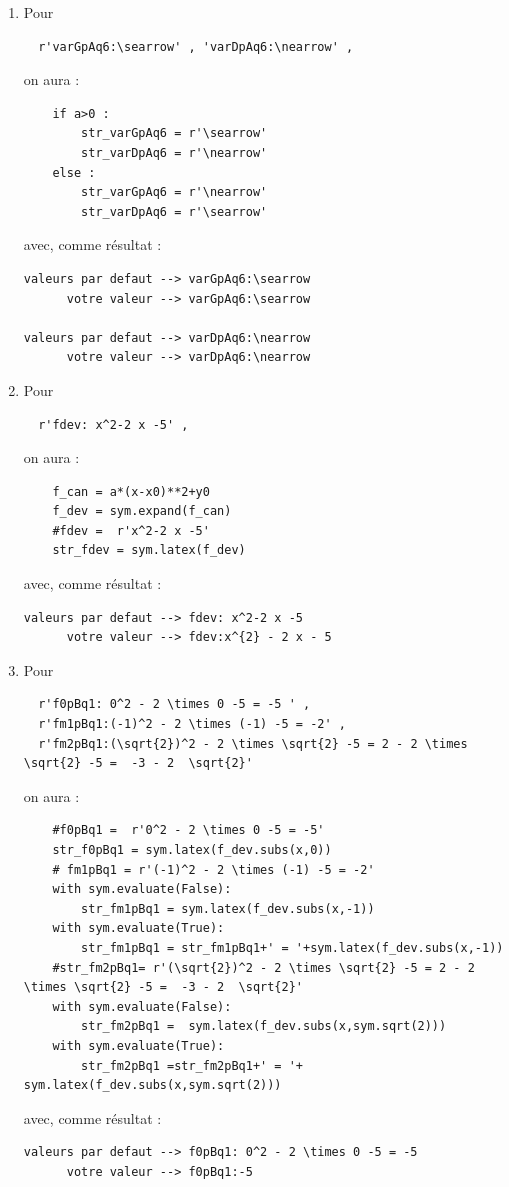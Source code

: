 {\begin{enumerate}
\begin{verbatim}
\end{verbatim}
avec, comme résultat : 
\begin{verbatim}
valeurs par defaut --> ques5solS: [-3\,;\,-0.7] \cup  [2.7\,;\,4]
      votre valeur --> ques5solS:[ -3\,;\,-0.73 ] \cup  [ 2.73\,;\,4.0 ] 
\end{verbatim}

\item Pour
\begin{verbatim}
  r'varGpAq6:\searrow' , 'varDpAq6:\nearrow' ,  
\end{verbatim}
on aura : 
\begin{verbatim}
    if a>0 :        
        str_varGpAq6 = r'\searrow'
        str_varDpAq6 = r'\nearrow' 
    else :
        str_varGpAq6 = r'\nearrow'
        str_varDpAq6 = r'\searrow'
\end{verbatim}
avec, comme résultat :
\begin{verbatim}
valeurs par defaut --> varGpAq6:\searrow
      votre valeur --> varGpAq6:\searrow

valeurs par defaut --> varDpAq6:\nearrow
      votre valeur --> varDpAq6:\nearrow
\end{verbatim}

\item Pour
\begin{verbatim}
  r'fdev: x^2-2 x -5' , 
\end{verbatim}
on aura : 
\begin{verbatim}
    f_can = a*(x-x0)**2+y0
    f_dev = sym.expand(f_can)
    #fdev =  r'x^2-2 x -5'     
    str_fdev = sym.latex(f_dev)
\end{verbatim}
avec, comme résultat :
\begin{verbatim}
valeurs par defaut --> fdev: x^2-2 x -5
      votre valeur --> fdev:x^{2} - 2 x - 5
\end{verbatim}

\item Pour
\begin{verbatim}
  r'f0pBq1: 0^2 - 2 \times 0 -5 = -5 ' , 
  r'fm1pBq1:(-1)^2 - 2 \times (-1) -5 = -2' , 
  r'fm2pBq1:(\sqrt{2})^2 - 2 \times \sqrt{2} -5 = 2 - 2 \times \sqrt{2} -5 =  -3 - 2  \sqrt{2}' 
\end{verbatim}
on aura : 
\begin{verbatim}
    #f0pBq1 =  r'0^2 - 2 \times 0 -5 = -5'  
    str_f0pBq1 = sym.latex(f_dev.subs(x,0))
    # fm1pBq1 = r'(-1)^2 - 2 \times (-1) -5 = -2' 
    with sym.evaluate(False):
        str_fm1pBq1 = sym.latex(f_dev.subs(x,-1))
    with sym.evaluate(True):
        str_fm1pBq1 = str_fm1pBq1+' = '+sym.latex(f_dev.subs(x,-1))    
    #str_fm2pBq1= r'(\sqrt{2})^2 - 2 \times \sqrt{2} -5 = 2 - 2 \times \sqrt{2} -5 =  -3 - 2  \sqrt{2}' 
    with sym.evaluate(False):
        str_fm2pBq1 =  sym.latex(f_dev.subs(x,sym.sqrt(2)))
    with sym.evaluate(True):
        str_fm2pBq1 =str_fm2pBq1+' = '+  sym.latex(f_dev.subs(x,sym.sqrt(2)))
\end{verbatim}
avec, comme résultat :
\begin{verbatim}
valeurs par defaut --> f0pBq1: 0^2 - 2 \times 0 -5 = -5 
      votre valeur --> f0pBq1:-5


\end{verbatim}
\end{enumerate}}
